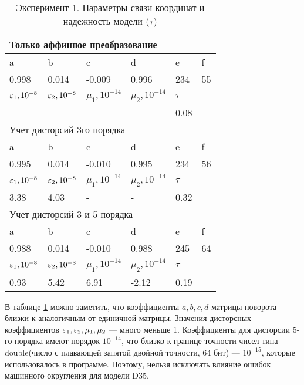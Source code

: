 \begin{table}[H]
\centering
\caption{Эксперимент 1. Параметры связи координат и надежность модели ($\tau$)}
\label{table:coeffs_reliability}

\begin{tabular}{|l|l|l|l|l|l|}
\hline
\multicolumn{6}{|l|}{Только аффинное преобразование}\\ \hline
a     & b     & c       & d     & e      & f     \\ \hline
0.998 & 0.014 & -0.009  & 0.996 & 234 & 55 \\ \hline

$\varepsilon_1, 10^{-8}$ & $\varepsilon_2, 10^{-8}$ & $\mu_1, 10^{-14}$ & $\mu_2, 10^{-14}$ & $\tau$ & \\ \hline
-                 & -                 & -                 & -                 & 0.08   & \\ \hline

\hline
\multicolumn{6}{|l|}{Учет дисторсий 3го порядка}\\ \hline
a     & b     & c      & d     & e   & f  \\ \hline
0.995 & 0.014 & -0.010 & 0.995 & 234 & 56 \\ \hline

$\varepsilon_1, 10^{-8}$ & $\varepsilon_2, 10^{-8}$ & $\mu_1, 10^{-14}$ & $\mu_2, 10^{-14}$ & $\tau$ & \\ \hline
3.38              & 4.03              & -                 & -                 & 0.32   & \\ \hline

\hline
\multicolumn{6}{|l|}{Учет дисторсий 3 и 5 порядка}\\ \hline
a     & b     & c      & d     & e   & f  \\ \hline
0.988 & 0.014 & -0.010 & 0.988 & 245 & 64 \\ \hline

$\varepsilon_1, 10^{-8}$ & $\varepsilon_2, 10^{-8}$ & $\mu_1, 10^{-14}$ & $\mu_2, 10^{-14}$ & $\tau$ & \\ \hline
0.93              & 5.42              & 6.91              & -2.12             & 0.19   & \\ \hline
\end{tabular}
\end{table}

В таблице \ref{table:coeffs_reliability} можно заметить, что коэффициенты $a, b, c, d$ матрицы поворота близки к аналогичным от единичной матрицы. Значения дисторсных коэффициентов $\varepsilon_1, \varepsilon_2, \mu_1, \mu_2$ --- много меньше 1. Коэффициенты для дисторсии 5-го порядка имеют порядок $10^{-14}$, что близко к границе точности чисел типа double(число с плавающей запятой двойной точности, 64 бит) --- $10^{-15}$, которые использовалось в программе. Поэтому, нельзя исключать влияние ошибок машинного округления для модели D35.

